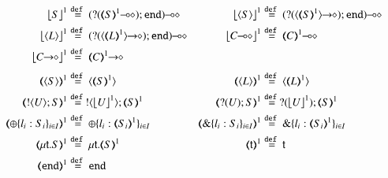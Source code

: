 
\begin{figure}[t!]
\\
\begin{align*}
	\vtmap{{S}}{1} & \defeq	\lhot{(\btinp{\lhot{\tmap{S}{1}}} \tinact)}
	&  
	\vtmap{\chtype{S}}{1} & \defeq	\lhot{(\btinp{\shot{\chtype{\tmap{S}{1}}}} \tinact)}
	\\
	\vtmap{\chtype{L}}{1} & \defeq	\lhot{(\btinp{\shot{\chtype{\tmap{L}{1}}}} \tinact)}
	&  
	\vtmap{\lhot{C}}{1} & \defeq \lhot{\tmap{C}{1}}
	\\
	\vtmap{\shot{C}}{1} & \defeq\shot{\tmap{C}{1}}
	\\[1mm]
	\tmap{\chtype{S}}{1} & \defeq	\chtype{\tmap{S}{1}} 
	&
	\tmap{\chtype{L}}{1} & \defeq\chtype{\tmap{L}{1}}
	\\
	\tmap{\btout{U} S}{1} & \defeq \btout{{\vtmap{U}{1}}} \tmap{S}{1}
	&
	\tmap{\btinp{U} S}{1} & \defeq\btinp{{\vtmap{U}{1}}} \tmap{S}{1}
	\\
	\tmap{\btsel{l_i: S_i}_{i \in I}}{1} & \defeq \btsel{l_i: \tmap{S_i}{1}}_{i \in I}
	&
	\tmap{\btbra{l_i: S_i}_{i \in I}}{1} & \defeq \btbra{l_i: \tmap{S_i}{1}}_{i \in I}
	\\
	\tmap{\trec{t}{S}}{1}  & \defeq \trec{t}{\tmap{S}{1}}
		&
		\tmap{\vart{t}}{1} & \defeq \vart{t} 
			\\
		\tmap{\tinact}{1}  & \defeq  \tinact
\end{align*}


\end{figure}
